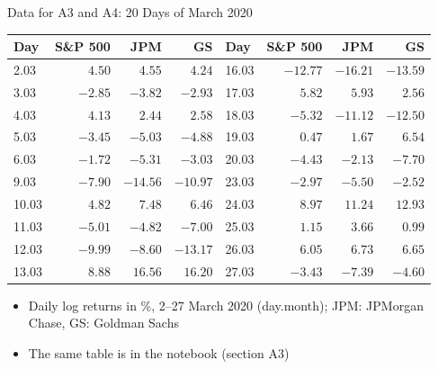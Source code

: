\begin{frame}{Data for A3 and A4: 20 Days of March 2020}
\itemsize{\footnotesize}
\begin{center}
\scriptsize
\begin{tabular}{lrrr|lrrr}
\toprule
Day & S\&P 500 & JPM & GS & Day & S\&P 500 & JPM & GS \\
\midrule
2.03 & $4.50$ & $4.55$ & $4.24$ & 16.03 & $-12.77$ & $-16.21$ & $-13.59$ \\
3.03 & $-2.85$ & $-3.82$ & $-2.93$ & 17.03 & $5.82$ & $5.93$ & $2.56$ \\
4.03 & $4.13$ & $2.44$ & $2.58$ & 18.03 & $-5.32$ & $-11.12$ & $-12.50$ \\
5.03 & $-3.45$ & $-5.03$ & $-4.88$ & 19.03 & $0.47$ & $1.67$ & $6.54$ \\
6.03 & $-1.72$ & $-5.31$ & $-3.03$ & 20.03 & $-4.43$ & $-2.13$ & $-7.70$ \\
9.03 & $-7.90$ & $-14.56$ & $-10.97$ & 23.03 & $-2.97$ & $-5.50$ & $-2.52$ \\
10.03 & $4.82$ & $7.48$ & $6.46$ & 24.03 & $8.97$ & $11.24$ & $12.93$ \\
11.03 & $-5.01$ & $-4.82$ & $-7.00$ & 25.03 & $1.15$ & $3.66$ & $0.99$ \\
12.03 & $-9.99$ & $-8.60$ & $-13.17$ & 26.03 & $6.05$ & $6.73$ & $6.65$ \\
13.03 & $8.88$ & $16.56$ & $16.20$ & 27.03 & $-3.43$ & $-7.39$ & $-4.60$ \\
\bottomrule
\end{tabular}
\end{center}
\begin{itemize}
    \item Daily log returns in \%, 2--27 March 2020 (day.month); JPM: JPMorgan Chase, GS: Goldman Sachs
    \item The same table is in the notebook (section A3)
\end{itemize}
\end{frame}

